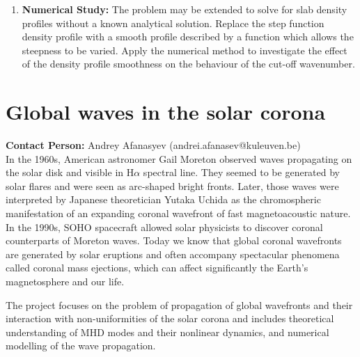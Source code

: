 \documentclass[11pt]{article}
\begin{document}
\begin{enumerate}
\item {\bf Numerical Study:}
The problem may be extended to solve for slab density profiles without a known analytical solution.
Replace the step function density profile with a smooth profile described by a function which allows the steepness to be varied.
Apply the numerical method to investigate the effect of the density profile smoothness on the behaviour of the cut-off wavenumber.

\end{enumerate}

\newpage
\section{Global waves in the solar corona}
 {\bf Contact Person: } Andrey Afanasyev (andrei.afanasev@kuleuven.be)\\
 
 In the 1960s, American astronomer Gail Moreton observed waves propagating on the solar disk and visible in H$\alpha$ spectral line. They seemed to be generated by solar flares and were seen as arc-shaped bright fronts. Later, those waves were interpreted by Japanese theoretician Yutaka Uchida as the chromospheric manifestation of an expanding coronal wavefront of fast magnetoacoustic nature. In the 1990s, SOHO spacecraft allowed solar physicists to discover coronal counterparts of Moreton waves. Today we know that global coronal wavefronts are generated by solar eruptions and often accompany spectacular phenomena called coronal mass ejections, which can affect significantly the Earth's magnetosphere and our life.
 
 The project focuses on the problem of propagation of global wavefronts and their interaction with non-uniformities of the solar corona and includes theoretical understanding of MHD modes and their nonlinear dynamics, and numerical modelling of the wave propagation.
 
\end{document}
